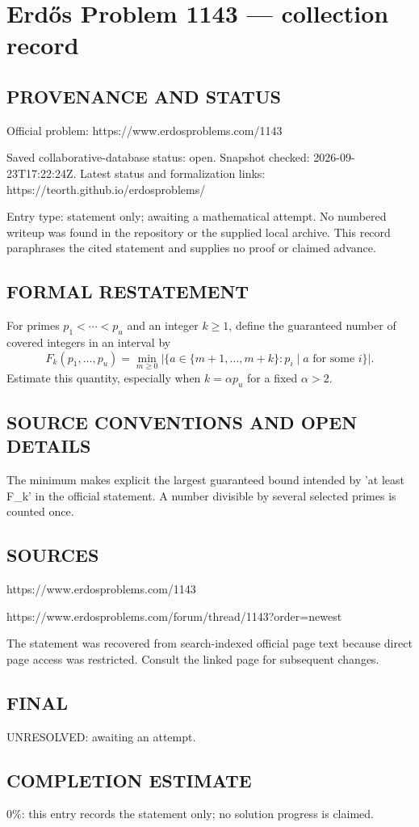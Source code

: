 \section*{Erd\H{o}s Problem 1143 --- collection record}

\subsection*{PROVENANCE AND STATUS}
Official problem: https://www.erdosproblems.com/1143

Saved collaborative-database status: open.
Snapshot checked: 2026-09-23T17:22:24Z.
Latest status and formalization links: https://teorth.github.io/erdosproblems/

Entry type: statement only; awaiting a mathematical attempt. No numbered writeup was found in the repository or the supplied local archive. This record paraphrases the cited statement and supplies no proof or claimed advance.

\subsection*{FORMAL RESTATEMENT}
For primes $p_1<\cdots<p_u$ and an integer $k\geq1$, define the guaranteed number of covered integers in an interval by
\[
F_k(p_1,\ldots,p_u)=\min_{m\geq0}\bigl|\{a\in\{m+1,\ldots,m+k\}:p_i\mid a\text{ for some }i\}\bigr|.
\]
Estimate this quantity, especially when $k=\alpha p_u$ for a fixed $\alpha>2$.

\subsection*{SOURCE CONVENTIONS AND OPEN DETAILS}
The minimum makes explicit the largest guaranteed bound intended by 'at least F_k' in the official statement. A number divisible by several selected primes is counted once.

\subsection*{SOURCES}
https://www.erdosproblems.com/1143

https://www.erdosproblems.com/forum/thread/1143?order=newest

The statement was recovered from search-indexed official page text because direct page access was restricted. Consult the linked page for subsequent changes.

\subsection*{FINAL}
UNRESOLVED: awaiting an attempt.

\subsection*{COMPLETION ESTIMATE}
$0\%$: this entry records the statement only; no solution progress is claimed.
